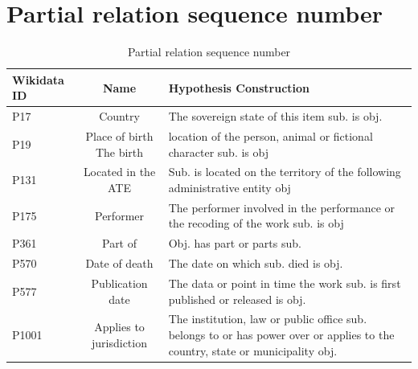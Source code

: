\documentclass[preprint,12pt]{elsarticle}
\begin{document}







%  


\appendix
\begin{table}[h]
\section{Partial relation sequence number}
\caption{Partial relation sequence number}\label{app1}
\begin{tabular*}{\textwidth}{@{\extracolsep\fill}lcp{7cm}}
\toprule%
Wikidata ID & Name & Hypothesis Construction \\
\midrule
P17&	Country	&The sovereign state of this item sub. is obj.\\
P19	&Place of birth	The birth& location of the person, animal or fictional character sub. is obj\\
P131&	Located in the ATE	&Sub. is located on the territory of the following administrative entity obj\\
P175 &Performer&	The performer involved in the performance or the recoding of the work sub. is obj\\
P361&	Part of&	Obj. has part or parts sub.\\
P570&	Date of death&	The date on which sub. died is obj.\\
P577&	Publication date&	The data or point in time the work sub. is first published or released is obj.\\
P1001&	 Applies to jurisdiction&	The institution, law or public office sub. belongs to or has power over or applies to the country, state or municipality obj.\\
\hline
\end{tabular*}
\end{table}
\end{document}
